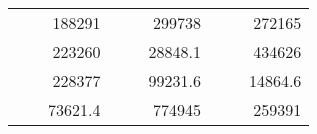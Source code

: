 \begin{table}[H]
\begin{tabular}{|ccrccrccc}
\rowcolor[HTML]{DAE8FC} 
\multicolumn{1}{|c|}{\cellcolor[HTML]{FFFFC7}}                                & \multicolumn{1}{c|}{\cellcolor[HTML]{DAE8FC}}                      & \multicolumn{1}{r|}{\cellcolor[HTML]{DAE8FC}188291}    & \multicolumn{1}{c|}{\cellcolor[HTML]{FFFFC7}}                                & \multicolumn{1}{c|}{\cellcolor[HTML]{DAE8FC}}                       & \multicolumn{1}{r|}{\cellcolor[HTML]{DAE8FC}299738}    & \multicolumn{1}{c|}{\cellcolor[HTML]{FFFFC7}}                                & \multicolumn{1}{c|}{\cellcolor[HTML]{DAE8FC}}                      & \multicolumn{1}{r|}{\cellcolor[HTML]{DAE8FC}272165}    \\ \cline{3-3} \cline{6-6} \cline{9-9} 
\multicolumn{1}{|c|}{\cellcolor[HTML]{FFFFC7}}                                & \multicolumn{1}{c|}{\cellcolor[HTML]{DAE8FC}}                      & \multicolumn{1}{r|}{\cellcolor[HTML]{DDFDFF}223260}    & \multicolumn{1}{c|}{\cellcolor[HTML]{FFFFC7}}                                & \multicolumn{1}{c|}{\cellcolor[HTML]{DAE8FC}}                       & \multicolumn{1}{r|}{\cellcolor[HTML]{DDFDFF}28848.1}   & \multicolumn{1}{c|}{\cellcolor[HTML]{FFFFC7}}                                & \multicolumn{1}{c|}{\cellcolor[HTML]{DAE8FC}}                      & \multicolumn{1}{r|}{\cellcolor[HTML]{DDFDFF}434626}    \\ \cline{3-3} \cline{6-6} \cline{9-9} 
\rowcolor[HTML]{DAE8FC} 
\multicolumn{1}{|c|}{\cellcolor[HTML]{FFFFC7}}                                & \multicolumn{1}{c|}{\cellcolor[HTML]{DAE8FC}}                      & \multicolumn{1}{r|}{\cellcolor[HTML]{DAE8FC}228377}    & \multicolumn{1}{c|}{\cellcolor[HTML]{FFFFC7}}                                & \multicolumn{1}{c|}{\cellcolor[HTML]{DAE8FC}}                       & \multicolumn{1}{r|}{\cellcolor[HTML]{DAE8FC}99231.6}   & \multicolumn{1}{c|}{\cellcolor[HTML]{FFFFC7}}                                & \multicolumn{1}{c|}{\cellcolor[HTML]{DAE8FC}}                      & \multicolumn{1}{r|}{\cellcolor[HTML]{DAE8FC}14864.6}   \\ \cline{3-3} \cline{6-6} \cline{9-9} 
\multicolumn{1}{|c|}{\cellcolor[HTML]{FFFFC7}}                                & \multicolumn{1}{c|}{\cellcolor[HTML]{DAE8FC}}                      & \multicolumn{1}{r|}{\cellcolor[HTML]{DDFDFF}73621.4}   & \multicolumn{1}{c|}{\cellcolor[HTML]{FFFFC7}}                                & \multicolumn{1}{c|}{\cellcolor[HTML]{DAE8FC}}                       & \multicolumn{1}{r|}{\cellcolor[HTML]{DDFDFF}774945}    & \multicolumn{1}{c|}{\cellcolor[HTML]{FFFFC7}}                                & \multicolumn{1}{c|}{\cellcolor[HTML]{DAE8FC}}                      & \multicolumn{1}{r|}{\cellcolor[HTML]{DDFDFF}259391}    \\ \cline{3-3} \cline{6-6} \cline{9-9} 

\end{tabular}
\end{table}

